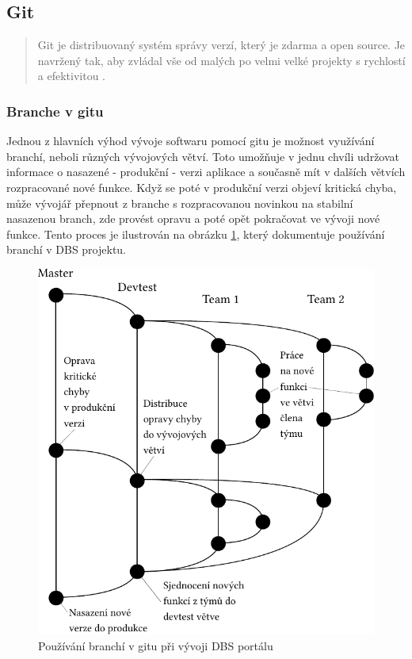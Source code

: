 \subsection{Git} \label{version:git}

\begin{quote}
Git je distribuovaný systém správy verzí, který je zdarma a open source. Je navržený tak, aby zvládal vše od malých po velmi velké projekty s rychlostí a efektivitou \cite{git}.
\end{quote}

\subsubsection{Branche v gitu} \label{version:git:branching}
Jednou z hlavních výhod vývoje softwaru pomocí gitu je možnost využívání branchí, neboli různých vývojových větví. Toto umožňuje v jednu chvíli udržovat informace o nasazené - produkční - verzi aplikace a současně mít v dalších větvích rozpracované nové funkce. Když se poté v produkční verzi objeví kritická chyba, může vývojář přepnout z branche s rozpracovanou novinkou na stabilní nasazenou branch, zde provést opravu a poté opět pokračovat ve vývoji nové funkce. Tento proces je ilustrován na obrázku \ref{picture:git_branching}, který dokumentuje používání branchí v DBS projektu.\\
\begin{figure}[h]
\includegraphics[width=\textwidth]{../pdf/git_branching.pdf}
\caption{Používání branchí v gitu při vývoji DBS portálu} \label{picture:git_branching}
\end{figure}
